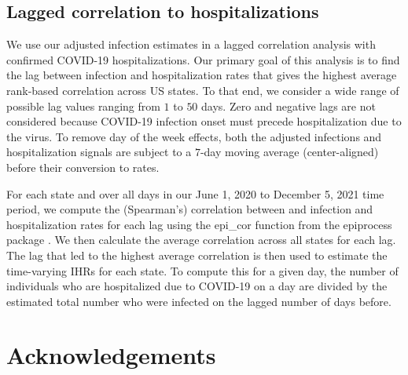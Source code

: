\documentclass{article}
\begin{document}
\subsection{Lagged correlation to hospitalizations} We use our adjusted infection estimates in a lagged correlation analysis with confirmed COVID-19 hospitalizations. Our primary goal of this analysis is to find the lag between infection and hospitalization rates that gives the highest average rank-based correlation across US states. To that end, we consider a wide range of possible lag values ranging from $1$ to $50$ days. Zero and negative lags are not considered because COVID-19 infection onset must precede hospitalization due to the virus. To remove day of the week effects, both the adjusted infections and hospitalization signals are subject to a $7$-day moving average (center-aligned) before their conversion to rates.

For each state and over all days in our June 1, 2020 to December 5, 2021 time period, we compute the (Spearman’s) correlation between and infection and hospitalization rates for each lag using the epi\_cor function from the epiprocess package \citep{brooks2023epiprocess}. We then calculate the average correlation across all states for each lag. The lag that led to the highest average correlation is then used to estimate the time-varying IHRs for each state. To compute this for a given day, the number of individuals who are hospitalized due to COVID-19 on a day are divided by the estimated total number who were infected on the lagged number of days before.



\section{Acknowledgements}
\end{document}
